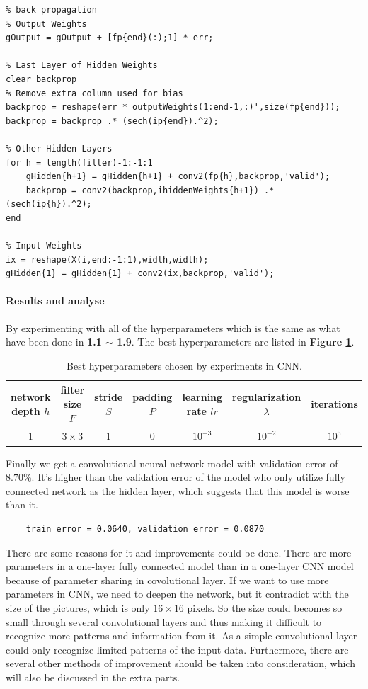 \documentclass{article}
\begin{document}
\begin{lstlisting}
% back propagation
% Output Weights
gOutput = gOutput + [fp{end}(:);1] * err;

% Last Layer of Hidden Weights
clear backprop
% Remove extra column used for bias
backprop = reshape(err * outputWeights(1:end-1,:)',size(fp{end}));
backprop = backprop .* (sech(ip{end}).^2);

% Other Hidden Layers
for h = length(filter)-1:-1:1
    gHidden{h+1} = gHidden{h+1} + conv2(fp{h},backprop,'valid');
    backprop = conv2(backprop,ihiddenWeights{h+1}) .* (sech(ip{h}).^2);
end
    
% Input Weights
ix = reshape(X(i,end:-1:1),width,width);
gHidden{1} = gHidden{1} + conv2(ix,backprop,'valid');
\end{lstlisting}

\paragraph{Results and analyse}
By experimenting with all of the hyperparameters which is the same as what have been done in \textbf{1.1 $\sim$ 1.9}. The best hyperparameters are listed in \textbf{Figure \ref{tab3}}.

\begin{table}[H]
	\centering
	\caption{Best hyperparameters chosen by experiments in CNN.}
	\label{tab3}
	\begin{tabular}{ccccccc}
	\toprule
	network depth $h$& filter size $F$& stride $S$& padding $P$& learning rate $lr$& regularization $\lambda$& iterations\\
	\midrule
	1& $3\times 3$& 1& 0& $10^{-3}$& $10^{-2}$& $10^{5}$\\
	\bottomrule
	\end{tabular}
\end{table}

Finally we get a convolutional neural network model with validation error of $8.70\%$. It's higher than the validation error of the model who only utilize fully connected network as the hidden layer, which suggests that this model is worse than it.

\begin{commandline}
	\begin{verbatim}
	train error = 0.0640, validation error = 0.0870
	\end{verbatim}
\end{commandline}

There are some reasons for it and improvements could be done. There are more parameters in a one-layer fully connected model than in a one-layer CNN model because of parameter sharing in covolutional layer. If we want to use more parameters in CNN, we need to deepen the network, but it contradict with the size of the pictures, which is only $16\times 16$ pixels. So the size could becomes so small through several convolutional layers and thus making it difficult to recognize more patterns and information from it. As a simple convolutional layer could only recognize limited patterns of the input data.
Furthermore, there are several other methods of improvement should be taken into consideration, which will also be discussed in the extra parts.
\end{document}
